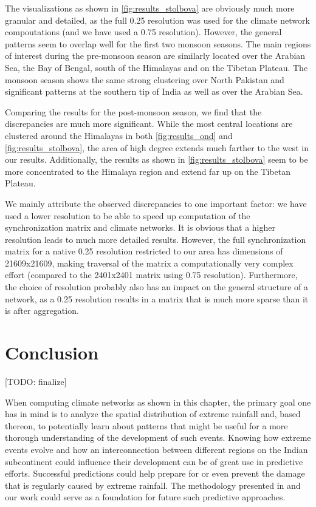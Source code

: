 The visualizations as shown in \cref{fig:results_stolbova} are obviously much more granular and detailed, as the full {0.25\degree} resolution was used for the climate network compoutations (and we have used a {0.75\degree} resolution). However, the general patterns seem to overlap well for the first two monsoon seasons. The main regions of interest during the pre-monsoon season are similarly located over the Arabian Sea, the Bay of Bengal, south of the Himalayas and on the Tibetan Plateau. The monsoon season shows the same strong clustering over North Pakistan and significant patterns at the southern tip of India as well as over the Arabian Sea.

Comparing the results for the post-monsoon season, we find that the discrepancies are much more significant. While the most central locations are clustered around the Himalayas in both \cref{fig:results_ond} and \cref{fig:results_stolbova}, the area of high degree extends much farther to the west in our results. Additionally, the results as shown in \cref{fig:results_stolbova} seem to be more concentrated to the Himalaya region and extend far up on the Tibetan Plateau.

We mainly attribute the observed discrepancies to one important factor: we have used a lower resolution to be able to speed up computation of the synchronization matrix and climate networks. It is obvious that a higher resolution leads to much more detailed results. However, the full synchronization matrix for a native {0.25\degree} resolution restricted to our area has dimensions of 21609x21609, making traversal of the matrix a computationally very complex effort (compared to the 2401x2401 matrix using {0.75\degree} resolution). Furthermore, the choice of resolution probably also has an impact on the general structure of a network, as a {0.25\degree} resolution results in a matrix that is much more sparse than it is after aggregation.

\section{Conclusion}
\label{st:event_sync_conclusion}
[TODO: finalize]

When computing climate networks as shown in this chapter, the primary goal one has in mind is to analyze the spatial distribution of extreme rainfall and, based thereon, to potentially learn about patterns that might be useful for a more thorough understanding of the development of such events. Knowing how extreme events evolve and how an interconnection between different regions on the Indian subcontinent could influence their development can be of great use in predictive efforts. Successful predictions could help prepare for or even prevent the damage that is regularly caused by extreme rainfall. The methodology presented in \citet{Stolbova.2015} and our work could serve as a foundation for future such predictive approaches.

